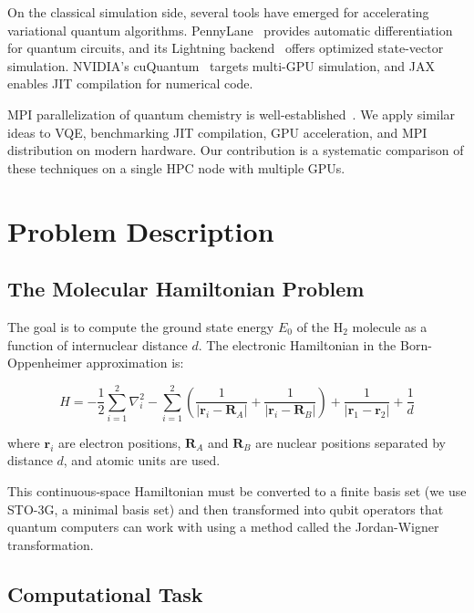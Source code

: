 \documentclass[11pt]{article}
\begin{document}
On the classical simulation side, several tools have emerged for accelerating variational quantum algorithms. PennyLane~\cite{bergholm2018} provides automatic differentiation for quantum circuits, and its Lightning backend~\cite{pennylane_lightning} offers optimized state-vector simulation. NVIDIA's cuQuantum~\cite{cuquantum2023} targets multi-GPU simulation, and JAX~\cite{jax2018} enables JIT compilation for numerical code.

MPI parallelization of quantum chemistry is well-established~\cite{valiev2010}. We apply similar ideas to VQE, benchmarking JIT compilation, GPU acceleration, and MPI distribution on modern hardware. Our contribution is a systematic comparison of these techniques on a single HPC node with multiple GPUs.

\section{Problem Description}

\subsection{The Molecular Hamiltonian Problem}

The goal is to compute the ground state energy $E_0$ of the H$_2$ molecule as a function of internuclear distance $d$. The electronic Hamiltonian in the Born-Oppenheimer approximation is:

\begin{equation}
    H = -\frac{1}{2}\sum_{i=1}^{2}\nabla_i^2 - \sum_{i=1}^{2}\left(\frac{1}{|\mathbf{r}_i - \mathbf{R}_A|} + \frac{1}{|\mathbf{r}_i - \mathbf{R}_B|}\right) + \frac{1}{|\mathbf{r}_1 - \mathbf{r}_2|} + \frac{1}{d}
\end{equation}

where $\mathbf{r}_i$ are electron positions, $\mathbf{R}_A$ and $\mathbf{R}_B$ are nuclear positions separated by distance $d$, and atomic units are used.

This continuous-space Hamiltonian must be converted to a finite basis set (we use STO-3G, a minimal basis set) and then transformed into qubit operators that quantum computers can work with using a method called the Jordan-Wigner transformation.

\subsection{Computational Task}
\end{document}
